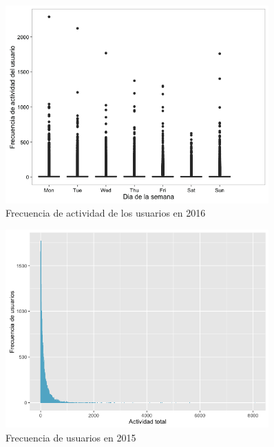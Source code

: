 \begin{figure}[H]
\centering
\includegraphics[width=0.9\textwidth]{../r/frecuenciaactividadusuario_2016}
\caption{Frecuencia de actividad de los usuarios en 2016}
\label{fig:frecuenciaactividadusuario_2016}
\end{figure}


\begin{figure}[H]
\centering
\includegraphics[width=0.9\textwidth]{../r/frecuenciausuarios_2015}
\caption{Frecuencia de usuarios en 2015}
\label{fig:frecuenciausuarios_2015}
\end{figure}


